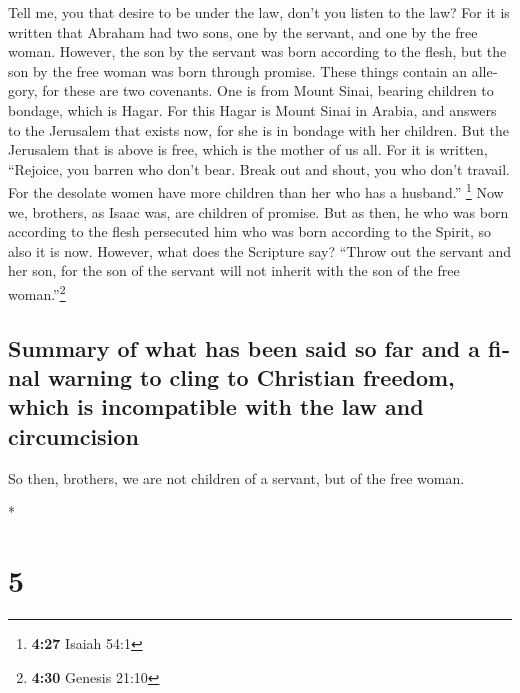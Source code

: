 \begin{paracol}{2}
\begin{otherlanguage}{english}
 Tell me, you that desire to be under the law, don't you
listen to the law?  For it is written that Abraham had
two sons, one by the servant, and one by the free woman. 
However, the son by the servant was born according to the flesh, but the
son by the free woman was born through promise.  These
things contain an allegory, for these are two covenants. One is from
Mount Sinai, bearing children to bondage, which is Hagar.
 For this Hagar is Mount Sinai in Arabia, and answers to
the Jerusalem that exists now, for she is in bondage with her children.
 But the Jerusalem that is above is free, which is the
mother of us all.  For it is written, ``Rejoice, you
barren who don't bear. Break out and shout, you who don't travail. For
the desolate women have more children than her who has a husband.''
\footnote{\textbf{4:27} Isaiah 54:1}  Now we, brothers,
as Isaac was, are children of promise.  But as then, he
who was born according to the flesh persecuted him who was born
according to the Spirit, so also it is now.  However,
what does the Scripture say? ``Throw out the servant and her son, for
the son of the servant will not inherit with the son of the free
woman.''\footnote{\textbf{4:30} Genesis 21:10}

\hypertarget{summary-of-what-has-been-said-so-far-and-a-final-warning-to-cling-to-christian-freedom-which-is-incompatible-with-the-law-and-circumcision}{%
\subsection{Summary of what has been said so far and a final warning to
cling to Christian freedom, which is incompatible with the law and
circumcision}\label{summary-of-what-has-been-said-so-far-and-a-final-warning-to-cling-to-christian-freedom-which-is-incompatible-with-the-law-and-circumcision}}

 So then, brothers, we are not children of a servant, but
of the free woman.

\end{otherlanguage}

\switchcolumn[0]*

\hypertarget{section-8}{%
\section{5}\label{section-8}}


\end{paracol}
